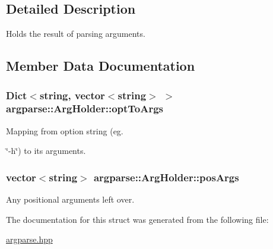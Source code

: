 \subsection{Detailed Description}
Holds the result of parsing arguments. 



\subsection{Member Data Documentation}
\hypertarget{structargparse_1_1_arg_holder_a930d6a9ba59a528783ea4df3410656ab}{
\subsubsection[{opt\-To\-Args}]{\setlength{\rightskip}{0pt plus 5cm}Dict$<$string, vector$<$string$>$ $>$ {\bf argparse\-::\-Arg\-Holder\-::opt\-To\-Args}}}\label{structargparse_1_1_arg_holder_a930d6a9ba59a528783ea4df3410656ab}


Mapping from option string (eg. 

\char`\"{}-\/h\char`\"{}) to its arguments. \hypertarget{structargparse_1_1_arg_holder_a3154d09426a4270992d6b54cc1eb2927}{
\subsubsection[{pos\-Args}]{\setlength{\rightskip}{0pt plus 5cm}vector$<$string$>$ {\bf argparse\-::\-Arg\-Holder\-::pos\-Args}}}\label{structargparse_1_1_arg_holder_a3154d09426a4270992d6b54cc1eb2927}


Any positional arguments left over. 



The documentation for this struct was generated from the following file\-:\begin{DoxyCompactItemize}
\item 
\hyperlink{argparse_8hpp}{argparse.\-hpp}\end{DoxyCompactItemize}
